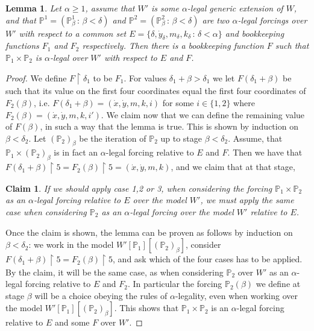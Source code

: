 \documentclass[a4paper,11pt]{article}
\newtheorem{lemma}[theorem]{Lemma}
\newtheorem*{claim}{Claim}
\newcommand{\forceP}{\mathbb{P}}
\begin{document}
\begin{lemma}\label{productlegal}
Let $\alpha \ge 1$, assume that $W'$ is some $\alpha$-legal generic extension of $W$, and that $\forceP^1=(\forceP^1_{\beta} \,: \,\beta < \delta)$ and $\forceP^2=(\forceP^2_{\beta} \,: \, \beta < \delta) $ are two $\alpha$-legal forcings over $W'$ with respect to a common set $E=\{\delta,\dot{y}_{\delta},m_{\delta}, k_{\delta} \,: \, \delta < \alpha\}$ and bookkeeping functions $F_1$ and $F_2$ respectively. 
Then there is a bookkeeping function $F$ such that $\forceP_1 \times \forceP_2$ is $\alpha$-legal over $W'$ with respect to $E$ and $F$.
\end{lemma}
\begin{proof}
We define $F \upharpoonright \delta_1$ to be $F_1$. For values $\delta_1+ \beta > \delta_1$ we let $F(\delta_1+\beta)$ be such that its value on the first four coordinates equal the first four coordinates of $F_2(\beta)$, i.e. $F(\delta_1+\beta)=(\dot{x},\dot{y},m,k,i)$ for some $i \in \{1,2\}$ where $F_2(\beta)=(\dot{x},\dot{y},m,k,i')$. We claim now that we can define the remaining value of $F(\beta)$, in such a way that the lemma is true. This is shown by induction on $\beta< \delta_2$.
Let $(\forceP_2)_{\beta}$ be the iteration of $\forceP_2$ up to stage $\beta < \delta_2$. Assume, that $\forceP_1 \times (\forceP_2)_{\beta}$ is in fact an $\alpha$-legal forcing relative to $E$ and $F$. Then we have that $F(\delta_1+\beta) \upharpoonright 5=F_2(\beta) \upharpoonright 5 =(\dot{x},\dot{y},m,k)$, and we claim that at that stage,
\begin{claim} 
If we should apply case 1,2 or 3, when considering the forcing $\forceP_1 \times \forceP_2$ as an $\alpha$-legal forcing relative to $E$ over the model $W'$, we must apply the same case when considering $\forceP_2$ as an $\alpha$-legal forcing over the model $W'$ relative to $E$.
\end{claim}   
Once the claim is shown, the lemma can be proven as follows by induction on $\beta < \delta_2$: we work in the model $W'[\forceP_1][(\forceP_2)_{\beta}]$, consider $F(\delta_1+\beta) \upharpoonright 5 = F_2(\beta) \upharpoonright 5$, and ask which of the four cases has to be applied. By the claim, it will be the same case, as when considering $\forceP_2$ over $W'$ as an $\alpha$-legal forcing relative to $E$ and $F_2$. In particular the forcing $\forceP_2(\beta)$ we define at stage $\beta$ will be a choice obeying the rules of $\alpha$-legality, even when working over the model $W'[\forceP_1][(\forceP_2)_{\beta}]$.  This shows that $\forceP_1 \times \forceP_2$ is an $\alpha$-legal forcing relative to $E$ and some $F$ over $W'$.


\end{proof}
\end{document}

